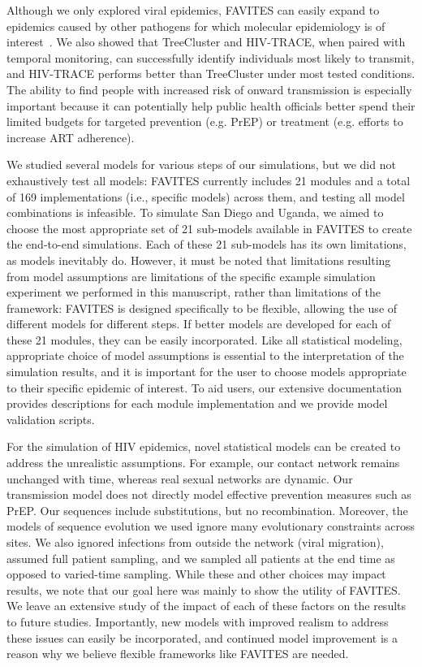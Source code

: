 Although we only explored viral epidemics, FAVITES can easily expand to epidemics caused by other pathogens for which molecular epidemiology is of interest~\cite{Azarian2014}. We also showed that TreeCluster and HIV-TRACE, when paired with temporal monitoring, can successfully identify individuals most likely to transmit, and HIV-TRACE performs better than TreeCluster under most tested conditions. The ability to find people with increased risk of onward transmission is especially important because it can potentially help public health officials better spend their limited budgets for targeted prevention (e.g. \gls{PrEP}) or treatment (e.g. efforts to increase \gls{ART} adherence).

We studied several models for various steps of our simulations, but we did not exhaustively test all models: FAVITES currently includes 21 modules and a total of 169 implementations (i.e., specific models) across them, and testing all model combinations is infeasible. To simulate San Diego and Uganda, we aimed to choose the most appropriate set of 21 sub-models available in FAVITES to create the end-to-end simulations. Each of these 21 sub-models has its own limitations, as models inevitably do. However, it must be noted that limitations resulting from model assumptions are limitations of the specific example simulation experiment we performed in this manuscript, rather than limitations of the framework: FAVITES is designed specifically to be flexible, allowing the use of different models for different steps. If better models are developed for each of these 21 modules, they can be easily incorporated. Like all statistical modeling, appropriate choice of model assumptions is essential to the interpretation of the simulation results, and it is important for the user to choose models appropriate to their specific epidemic of interest. To aid users, our extensive documentation provides descriptions for each module implementation and we provide model validation scripts.

For the simulation of \gls{HIV} epidemics, novel statistical models can be created to address the unrealistic assumptions. For example, our contact network remains unchanged with time, whereas real sexual networks are dynamic. Our transmission model does not directly model effective prevention measures such as \gls{PrEP}. Our sequences include substitutions, but no recombination. Moreover, the models of sequence evolution we used ignore many evolutionary constraints across sites. We also ignored infections from outside the network (viral migration), assumed full patient sampling, and we sampled all patients at the end time as opposed to varied-time sampling. While these and other choices may impact results, we note that our goal here was mainly to show the utility of FAVITES. We leave an extensive study of the impact of each of these factors on the results to future studies. Importantly, new models with improved realism to address these issues can easily be incorporated, and continued model improvement is a reason why we believe flexible frameworks like FAVITES are needed.

